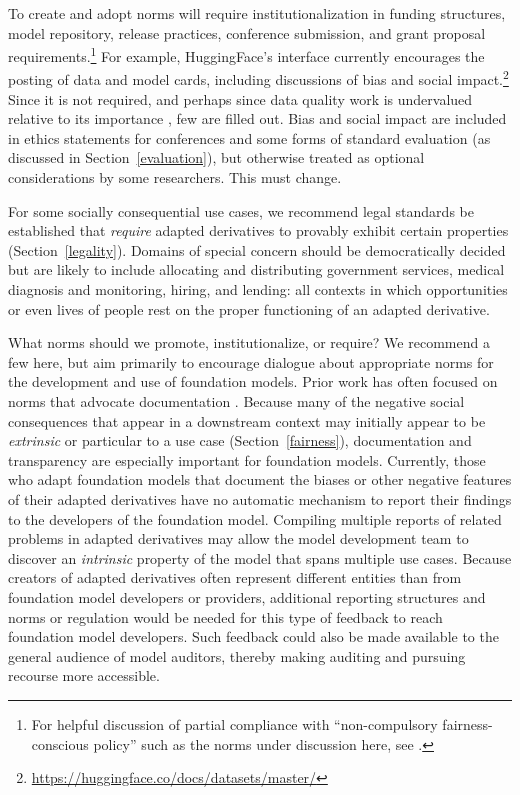 To create and adopt norms will require institutionalization in funding structures, model repository, release practices, conference submission, and grant proposal requirements.\footnote{For helpful discussion of partial compliance with ``non-compulsory fairness-conscious policy'' such as the norms under discussion here, see \citet{Dai2021}.}  
For example, HuggingFace’s interface currently encourages the posting of data and model cards, including discussions of bias and social impact.\footnote{\url{https://huggingface.co/docs/datasets/master/}} 
Since it is not required, and perhaps since data quality work is undervalued relative to its importance \citep{sambasivan2021everyone}, few are filled out. Bias and social impact are included in ethics statements for conferences and some forms of standard evaluation (as discussed in Section~\ref{evaluation}), but otherwise treated as optional considerations by some researchers. This must change.

For some socially consequential use cases, we recommend legal standards be established that \textit{require} adapted derivatives to provably exhibit certain properties (Section~\ref{legality}).
Domains of special concern should be democratically decided but are likely to include allocating and distributing government services, medical diagnosis and monitoring, hiring, and lending: all contexts in which opportunities or even lives of people rest on the proper functioning of an adapted derivative. 

What norms should we promote, institutionalize, or require? We recommend a few here, but aim primarily to encourage dialogue about appropriate norms for the development and use of foundation models. Prior work has often focused on norms that advocate documentation \citep{gebru2018datasheets, bender2018data, Mitchell_2019, dodge2019work}. Because many of the negative social consequences that appear in a downstream context may initially appear to be \textit{extrinsic} or particular to a use case (Section~\ref{fairness}), documentation and transparency are especially important for foundation models. Currently, those who adapt foundation models that document the biases or other negative features of their adapted derivatives have no automatic mechanism to report their findings to the developers of the foundation model.  Compiling multiple reports of related problems in adapted derivatives may allow the model development team to discover an \textit{intrinsic} property of the model that spans multiple use cases. Because creators of adapted derivatives often represent different entities than from foundation model developers or providers, additional reporting structures and norms or regulation would be needed for this type of feedback to reach foundation model developers. Such feedback could also be made available to the general audience of model auditors, thereby making auditing and pursuing recourse more accessible.

